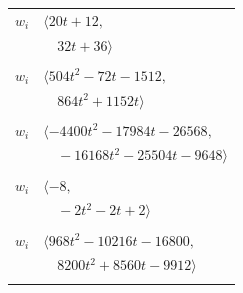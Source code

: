 \documentclass[11pt]{article}
\begin{document}
\begin{longtable}{@{}ll@{}}
$w_i$ & $\langle 20t+12,$\\
 & $\quad 32t+36\rangle$\\
\addlinespace[2pt]
\multicolumn{2}{@{}p{0.97\textwidth}@{}}{$i=5$, $D_i=8$, $\rho_{ij}$: $17{:}1, \allowbreak 18{:}2, \allowbreak 30{:}2, \allowbreak 33{:}1, \allowbreak 37{:}1, \allowbreak 39{:}2, \allowbreak 40{:}1, \allowbreak 41{:}1, \allowbreak 42{:}1, \allowbreak 45{:}2, \allowbreak 53{:}1, \allowbreak 56{:}2, \allowbreak 58{:}2, \allowbreak 60{:}1, \allowbreak 63{:}2, \allowbreak 66{:}2$}\\
$w_i$ & $\langle 504t^{2}-72t-1512,$\\
 & $\quad 864t^{2}+1152t\rangle$\\
\addlinespace[2pt]
\multicolumn{2}{@{}p{0.97\textwidth}@{}}{$i=6$, $D_i=152$, $\rho_{ij}$: $0{:}2, \allowbreak 1{:}2, \allowbreak 18{:}1, \allowbreak 23{:}2, \allowbreak 25{:}1, \allowbreak 26{:}2, \allowbreak 32{:}2, \allowbreak 38{:}2, \allowbreak 39{:}1, \allowbreak 46{:}1, \allowbreak 48{:}1, \allowbreak 50{:}1, \allowbreak 53{:}1, \allowbreak 60{:}1, \allowbreak 62{:}1, \allowbreak 64{:}1, \allowbreak 66{:}2$}\\
$w_i$ & $\langle -4400t^{2}-17984t-26568,$\\
 & $\quad -16168t^{2}-25504t-9648\rangle$\\
\addlinespace[2pt]
\multicolumn{2}{@{}p{0.97\textwidth}@{}}{$i=7$, $D_i=2$, $\rho_{ij}$: $41{:}1, \allowbreak 42{:}1, \allowbreak 45{:}1, \allowbreak 47{:}1, \allowbreak 51{:}1, \allowbreak 52{:}2, \allowbreak 56{:}2$}\\
$w_i$ & $\langle -8,$\\
 & $\quad -2t^{2}-2t+2\rangle$\\
\addlinespace[2pt]
\multicolumn{2}{@{}p{0.97\textwidth}@{}}{$i=8$, $D_i=152$, $\rho_{ij}$: $27{:}1, \allowbreak 28{:}1, \allowbreak 30{:}2, \allowbreak 37{:}2, \allowbreak 38{:}2, \allowbreak 39{:}2, \allowbreak 40{:}2, \allowbreak 42{:}1, \allowbreak 47{:}2, \allowbreak 58{:}1, \allowbreak 59{:}2, \allowbreak 63{:}1, \allowbreak 64{:}2, \allowbreak 65{:}2, \allowbreak 66{:}2$}\\
$w_i$ & $\langle 968t^{2}-10216t-16800,$\\
 & $\quad 8200t^{2}+8560t-9912\rangle$\\
\addlinespace[2pt]
\multicolumn{2}{@{}p{0.97\textwidth}@{}}{$i=9$, $D_i=2$, $\rho_{ij}$: $22{:}1, \allowbreak 25{:}2, \allowbreak 43{:}2, \allowbreak 46{:}2, \allowbreak 48{:}2, \allowbreak 49{:}1, \allowbreak 58{:}1$}\\

\end{longtable}
\end{document}
